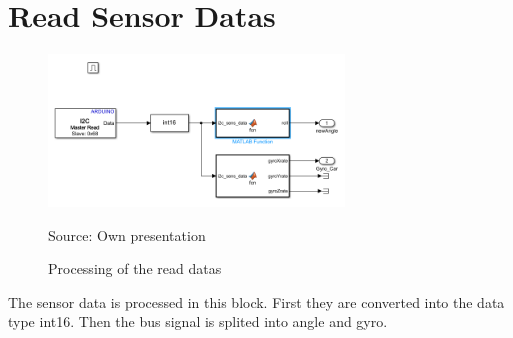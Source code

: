 %	
%	
%	
%	
%	
%	
%	

	
\section{Read Sensor Datas}\label{sec:read}
	\begin{figure}[!htbp]
		\centering
		\includegraphics[width=0.7\textwidth]{figures/read.PNG}
		\caption{Processing of the read datas}	
		Source: Own presentation	
		\label{fig:read}	
	\end{figure}
The sensor data is processed in this block. First they are converted into the data type int16. 
Then the bus signal is splited into angle and gyro.
